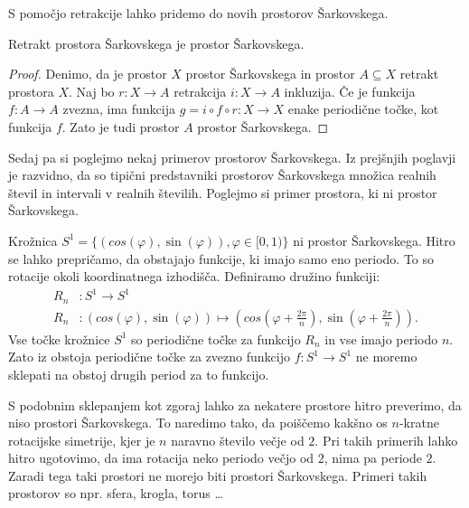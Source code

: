 \documentclass[../TG_magistrsko_delo_sections.tex]{subfiles}
\begin{document}
S pomočjo retrakcije lahko pridemo do novih prostorov Šarkovskega.

\begin{trditev}
Retrakt prostora Šarkovskega je prostor Šarkovskega.
\end{trditev}
\begin{proof}
Denimo, da je prostor $X$ prostor Šarkovskega in prostor $A \subseteq X$ retrakt prostora $X$. Naj bo $r : X \to A$ retrakcija $i : X \to A$ inkluzija. Če je funkcija $f : A \to A$ zvezna, ima funkcija $g = i \circ f \circ r : X \to X$ enake periodične točke, kot funkcija $f$. Zato je tudi prostor $A$ prostor Šarkovskega.
\end{proof}

Sedaj pa si poglejmo nekaj primerov prostorov Šarkovskega. Iz prejšnjih poglavji je razvidno, da so tipični predstavniki prostorov Šarkovskega množica realnih števil in intervali v realnih številih. Poglejmo si primer prostora, ki ni prostor Šarkovskega.

\begin{primer}
Krožnica $S^1 = \{ (cos(\varphi), \sin(\varphi)), \varphi \in [0, 1) \}$ ni prostor Šarkovskega. Hitro se lahko prepričamo, da obstajajo funkcije, ki imajo samo eno periodo. To so rotacije okoli koordinatnega izhodišča. Definiramo družino funkciji: 
\begin{equation*} %
\begin{split}
R_n &: S^1 \to S^1 \\ 
R_n &: (cos(\varphi), \sin(\varphi)) \mapsto (cos(\varphi + \frac{2 \pi}{n}), \sin(\varphi + \frac{2 \pi}{n})).
\end{split}
\end{equation*}
Vse točke krožnice $S^1$ so periodične točke za funkcijo $R_n$ in vse imajo periodo $n$. Zato iz obstoja periodične točke za zvezno funkcijo $f : S^1 \to S^1$ ne moremo sklepati na obstoj drugih period za to funkcijo.
\end{primer}
S podobnim sklepanjem kot zgoraj lahko za nekatere prostore hitro preverimo, da niso prostori Šarkovskega. To naredimo tako, da poiščemo kakšno os $n$-kratne rotacijske simetrije, kjer je $n$ naravno število večje od $2$. Pri takih primerih lahko hitro ugotovimo, da ima rotacija neko periodo večjo od $2$, nima pa periode $2$. Zaradi tega taki prostori ne morejo biti prostori Šarkovskega. Primeri takih prostorov so npr. sfera, krogla, torus \dots 
\end{document}
